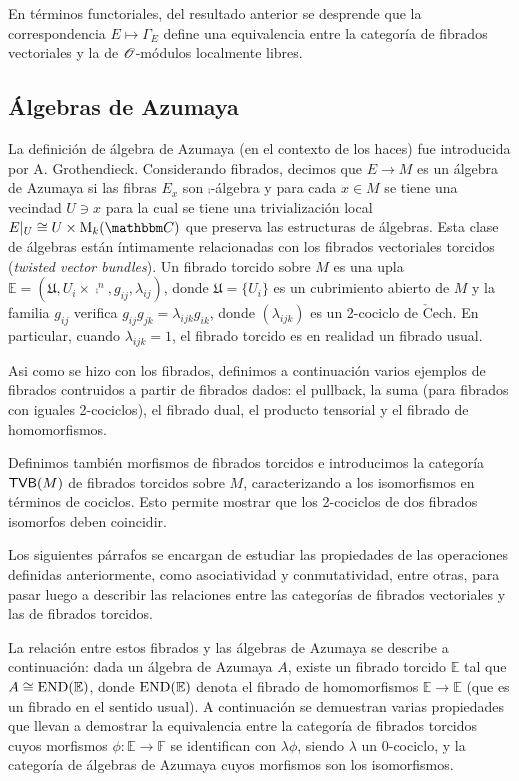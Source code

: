 {En t\'erminos functoriales, del resultado anterior se desprende que la correspondencia $E\mapsto \Gamma_E$ define una equivalencia entre la categor\'ia de fibrados vectoriales y la de $\mathscr{O}$-m\'odulos localmente libres.

\subsection{\'Algebras de Azumaya}

La definici\'on de \'algebra de Azumaya (en el contexto de los haces)
fue introducida por A. Grothendieck. Considerando fibrados, decimos
que $E\to M$ es un \'algebra de Azumaya si las fibras $E_x$ son
$\comp$-\'algebra y para cada $x\in M$ se tiene una vecindad $U\ni x$
para la cual se tiene una trivializaci\'on local
$E|_U\cong U\times \opnm{M}_k(\comp )$ que preserva las estructuras de
\'algebras. Esta clase de \'algebras est\'an \'intimamente
relacionadas con los fibrados vectoriales torcidos (\emph{twisted
  vector bundles}). Un fibrado torcido sobre $M$ es una upla
$\mathbb{E}=(\mathfrak{U},U_i\times \comp^n,g_{ij},\lambda_{ij})$,
donde $\mathfrak{U}=\{U_i\}$ es un cubrimiento abierto de $M$ y la
familia $g_{ij}$ verifica $g_{ij}g_{jk}=\lambda_{ijk}g_{ik}$, donde
$(\lambda_{ijk})$ es un 2-cociclo de $\check{\text{C}}$ech. En
particular, cuando $\lambda_{ijk}=1$, el fibrado torcido es en
realidad un fibrado usual.

Asi como se hizo con los fibrados, definimos a continuaci\'on varios
ejemplos de fibrados contruidos a partir de fibrados dados: el
pullback, la suma (para fibrados con iguales 2-cociclos), el fibrado
dual, el producto tensorial y el fibrado de homomorfismos.

Definimos tambi\'en morfismos de fibrados torcidos e introducimos la
categor\'ia $\mathsf{TVB}(M)$ de fibrados torcidos sobre $M$,
caracterizando a los isomorfismos en t\'erminos de cociclos. Esto
permite mostrar que los 2-cociclos de dos fibrados isomorfos deben
coincidir.

Los siguientes p\'arrafos se encargan de estudiar las propiedades de
las operaciones definidas anteriormente, como asociatividad y
conmutatividad, entre otras, para pasar luego a describir las
relaciones entre las categor\'ias de fibrados vectoriales y las de
fibrados torcidos.

La relaci\'on entre estos fibrados y las \'algebras de Azumaya se
describe a continuaci\'on: dada un \'algebra de Azumaya $A$, existe un
fibrado torcido $\mathbb{E}$ tal que $A\cong \operatorname{END}(\mathbb{E})$,
donde $\operatorname{END}(\mathbb{E})$ denota el fibrado de homomorfismos
$\mathbb{E}\to \mathbb{E}$ (que es un fibrado en el sentido usual). A
continuaci\'on se demuestran varias propiedades que llevan a demostrar
la equivalencia entre la categor\'ia de fibrados torcidos cuyos
morfismos $\phi :\mathbb{E}\to \mathbb{F}$ se identifican con
$\lambda \phi$, siendo $\lambda$ un 0-cociclo, y la categor\'ia de
\'algebras de Azumaya cuyos morfismos son los isomorfismos.

}
